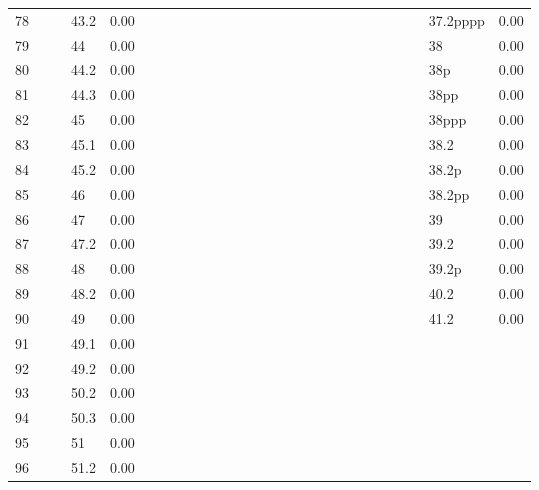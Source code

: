 \begin{table}[ht]
\begin{tabular}{rlrlrlrlrlrlrlrlrlrlrlrlrlr}
  78 &  &  & 43.2 & 0.00 &  &  &  &  &  &  &  &  &  &  &  &  &  &  &  &  &  &  &  &  & 37.2pppp & 0.00 \\ 
  79 &  &  & 44 & 0.00 &  &  &  &  &  &  &  &  &  &  &  &  &  &  &  &  &  &  &  &  & 38 & 0.00 \\ 
  80 &  &  & 44.2 & 0.00 &  &  &  &  &  &  &  &  &  &  &  &  &  &  &  &  &  &  &  &  & 38p & 0.00 \\ 
  81 &  &  & 44.3 & 0.00 &  &  &  &  &  &  &  &  &  &  &  &  &  &  &  &  &  &  &  &  & 38pp & 0.00 \\ 
  82 &  &  & 45 & 0.00 &  &  &  &  &  &  &  &  &  &  &  &  &  &  &  &  &  &  &  &  & 38ppp & 0.00 \\ 
  83 &  &  & 45.1 & 0.00 &  &  &  &  &  &  &  &  &  &  &  &  &  &  &  &  &  &  &  &  & 38.2 & 0.00 \\ 
  84 &  &  & 45.2 & 0.00 &  &  &  &  &  &  &  &  &  &  &  &  &  &  &  &  &  &  &  &  & 38.2p & 0.00 \\ 
  85 &  &  & 46 & 0.00 &  &  &  &  &  &  &  &  &  &  &  &  &  &  &  &  &  &  &  &  & 38.2pp & 0.00 \\ 
  86 &  &  & 47 & 0.00 &  &  &  &  &  &  &  &  &  &  &  &  &  &  &  &  &  &  &  &  & 39 & 0.00 \\ 
  87 &  &  & 47.2 & 0.00 &  &  &  &  &  &  &  &  &  &  &  &  &  &  &  &  &  &  &  &  & 39.2 & 0.00 \\ 
  88 &  &  & 48 & 0.00 &  &  &  &  &  &  &  &  &  &  &  &  &  &  &  &  &  &  &  &  & 39.2p & 0.00 \\ 
  89 &  &  & 48.2 & 0.00 &  &  &  &  &  &  &  &  &  &  &  &  &  &  &  &  &  &  &  &  & 40.2 & 0.00 \\ 
  90 &  &  & 49 & 0.00 &  &  &  &  &  &  &  &  &  &  &  &  &  &  &  &  &  &  &  &  & 41.2 & 0.00 \\ 
  91 &  &  & 49.1 & 0.00 &  &  &  &  &  &  &  &  &  &  &  &  &  &  &  &  &  &  &  &  &  &  \\ 
  92 &  &  & 49.2 & 0.00 &  &  &  &  &  &  &  &  &  &  &  &  &  &  &  &  &  &  &  &  &  &  \\ 
  93 &  &  & 50.2 & 0.00 &  &  &  &  &  &  &  &  &  &  &  &  &  &  &  &  &  &  &  &  &  &  \\ 
  94 &  &  & 50.3 & 0.00 &  &  &  &  &  &  &  &  &  &  &  &  &  &  &  &  &  &  &  &  &  &  \\ 
  95 &  &  & 51 & 0.00 &  &  &  &  &  &  &  &  &  &  &  &  &  &  &  &  &  &  &  &  &  &  \\ 
  96 &  &  & 51.2 & 0.00 &  &  &  &  &  &  &  &  &  &  &  &  &  &  &  &  &  &  &  &  &  &  \\ 
   \hline
\end{tabular}
\end{table}
